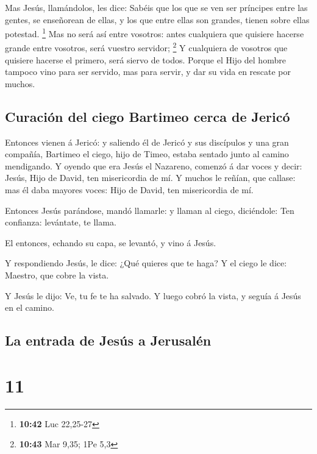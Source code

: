  Mas Jesús, llamándolos, les dice: Sabéis que los que se
ven ser príncipes entre las gentes, se enseñorean de ellas, y los que
entre ellas son grandes, tienen sobre ellas potestad. \footnote{\textbf{10:42}
  Luc 22,25-27}  Mas no será así entre vosotros: antes
cualquiera que quisiere hacerse grande entre vosotros, será vuestro
servidor; \footnote{\textbf{10:43} Mar 9,35; 1Pe 5,3}  Y
cualquiera de vosotros que quisiere hacerse el primero, será siervo de
todos.  Porque el Hijo del hombre tampoco vino para ser
servido, mas para servir, y dar su vida en rescate por muchos.

\hypertarget{curaciuxf3n-del-ciego-bartimeo-cerca-de-jericuxf3}{%
\subsection{Curación del ciego Bartimeo cerca de
Jericó}\label{curaciuxf3n-del-ciego-bartimeo-cerca-de-jericuxf3}}

 Entonces vienen á Jericó: y saliendo él de Jericó y sus
discípulos y una gran compañía, Bartimeo el ciego, hijo de Timeo, estaba
sentado junto al camino mendigando.  Y oyendo que era
Jesús el Nazareno, comenzó á dar voces y decir: Jesús, Hijo de David,
ten misericordia de mí.  Y muchos le reñían, que callase:
mas él daba mayores voces: Hijo de David, ten misericordia de mí.

 Entonces Jesús parándose, mandó llamarle: y llaman al
ciego, diciéndole: Ten confianza: levántate, te llama.

 El entonces, echando su capa, se levantó, y vino á
Jesús.

 Y respondiendo Jesús, le dice: ¿Qué quieres que te haga?
Y el ciego le dice: Maestro, que cobre la vista.

 Y Jesús le dijo: Ve, tu fe te ha salvado. Y luego cobró
la vista, y seguía á Jesús en el camino.

\hypertarget{la-entrada-de-jesuxfas-a-jerusaluxe9n}{%
\subsection{La entrada de Jesús a
Jerusalén}\label{la-entrada-de-jesuxfas-a-jerusaluxe9n}}

\hypertarget{section-10}{%
\section{11}\label{section-10}}

